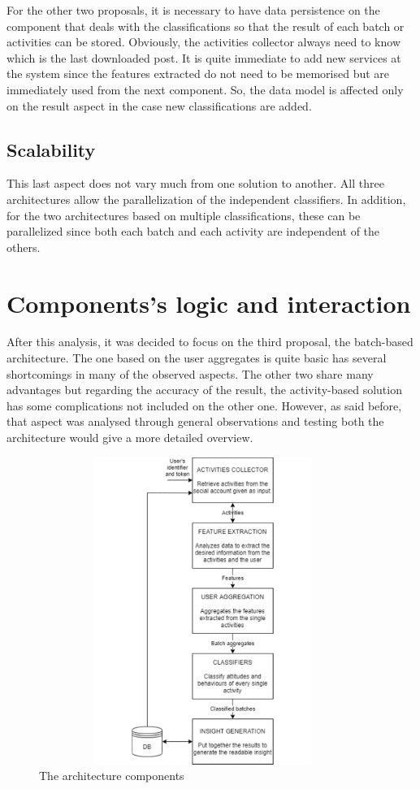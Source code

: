 For the other two proposals, it is necessary to have data persistence on the component that deals with the classifications so that the result of each batch or activities can be stored.
Obviously, the activities collector always need to know which is the last downloaded post.
It is quite immediate to add new services at the system since the features extracted do not need to be memorised but are immediately used from the next component. So, the data model is affected only on the result aspect in the case new classifications are added.

\subsection{Scalability}
This last aspect does not vary much from one solution to another. All three architectures allow the parallelization of the independent classifiers.
In addition, for the two architectures based on multiple classifications, these can be parallelized since both each batch and each activity are independent of the others.


\section{Components's logic and interaction}
After this analysis, it was decided to focus on the third proposal, the batch-based architecture.
The one based on the user aggregates is quite basic has several shortcomings in many of the observed aspects.
The other two share many advantages but regarding the accuracy of the result, the activity-based solution has some complications not included on the other one.
However, as said before, that aspect was analysed through general observations and testing both the architecture would give a more detailed overview.

\begin{figure}[htp]
    \centering
    \includegraphics[width=%
    0.95\textwidth,height=10cm,keepaspectratio]{img/components}
    \caption{The architecture components}
    \label{fig:components}
\end{figure}


